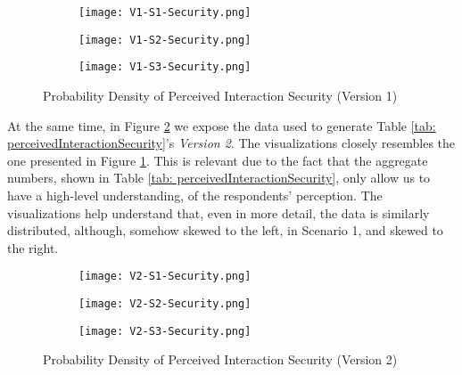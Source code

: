 \begin{figure}[htb]
    \centering
    \begin{subfigure}[b]{0.49\textwidth}
        \centering
        \texttt{[image: V1-S1-Security.png]}
    \end{subfigure}
    \begin{subfigure}[b]{0.49\textwidth}
        \centering
        \texttt{[image: V1-S2-Security.png]}
    \end{subfigure}
    \hfill
    \begin{subfigure}[b]{0.49\textwidth}
        \centering
         \texttt{[image: V1-S3-Security.png]}
    \end{subfigure}
    
    \caption{Probability Density of Perceived Interaction Security (Version 1)}
    \label{fig: perceivedInteractionSecurityOne}   
\end{figure}

At the same time, in Figure \ref{fig: perceivedInteractionSecurityTwo} we expose the data used to generate Table \ref{tab: perceivedInteractionSecurity}'s \textit{Version 2}. The visualizations closely resembles the one presented in Figure \ref{fig: perceivedInteractionSecurityOne}. This is relevant due to the fact that the aggregate numbers, shown in Table \ref{tab: perceivedInteractionSecurity}, only allow us to have a high-level understanding, of the respondents' perception. The visualizations help understand that, even in more detail, the data is similarly distributed, although, somehow skewed to the left, in Scenario 1, and skewed to the right.

\begin{figure}[htb]
    \centering
    \begin{subfigure}[b]{0.49\textwidth}
        \centering
        \texttt{[image: V2-S1-Security.png]}
    \end{subfigure}
    \begin{subfigure}[b]{0.49\textwidth}
        \centering
        \texttt{[image: V2-S2-Security.png]}
    \end{subfigure}
    \hfill
    \begin{subfigure}[b]{0.49\textwidth}
        \centering
        \texttt{[image: V2-S3-Security.png]}
    \end{subfigure}
    
    \caption{Probability Density of Perceived Interaction Security (Version 2)}
    \label{fig: perceivedInteractionSecurityTwo}   
\end{figure}

